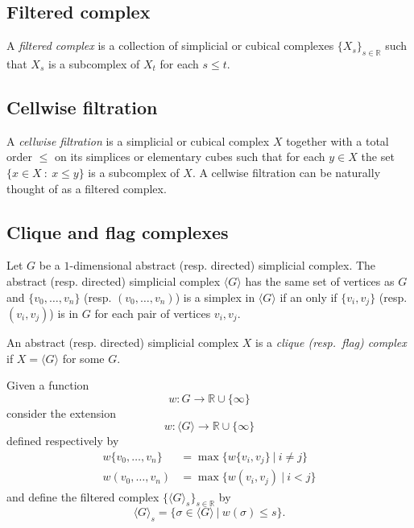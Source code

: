 \documentclass{amsart}
\begin{document}
	\subsection*{Filtered complex} \label{filtered_complex}
	
	A \textit{filtered complex} is a collection of simplicial or cubical complexes $\{X_s\}_{s \in \mathbb R}$ such that $X_s$ is a subcomplex of $X_t$ for each $s \leq t$.
	
	\subsection*{Cellwise filtration} \label{cellwise_filtration}
	
	A \textit{cellwise filtration} is a simplicial or cubical complex $X$ together with a total order $\leq$ on its simplices or elementary cubes such that for each $y \in X$ the set $\{x \in X\ :\ x \leq y\}$ is a subcomplex of $X$. A cellwise filtration can be naturally thought of as a 
	filtered complex.
	
	\subsection*{Clique and flag complexes} \label{clique_and_flag_complexes}
	
	Let $G$ be a $1$-dimensional abstract (resp. directed) simplicial complex. The abstract (resp. directed) simplicial complex $\langle G \rangle$ has the same set of vertices as $G$ and $\{v_0, \dots, v_n\}$ \big(resp. $(v_0, \dots, v_n)$\big) is a simplex in $\langle G \rangle$ if an only if $\{v_i, v_j\}$ \big(resp. $(v_i, v_j)$\big) is in $G$ for each pair of vertices $v_i, v_j$. 
	
	An abstract (resp. directed) simplicial complex $X$ is a \textit{clique (resp.\ flag) complex} if $X = \langle G \rangle$ for some $G$.
	
	Given a function
	\begin{equation*}
	w : G \to \mathbb R \cup \{\infty\}
	\end{equation*}
	consider the extension
	\begin{equation*}
	w : \langle G \rangle \to \mathbb R \cup \{\infty\}
	\end{equation*}
	defined respectively by 
	\begin{align*}
	w\{v_0, \dots, v_n\} & = \max\{ w\{v_i, v_j\}\ |\ i \neq j\} \\
	w(v_0, \dots, v_n) & = \max\{ w(v_i, v_j)\ |\ i < j\}
	\end{align*}
	and define the %
	filtered complex $\{\langle G \rangle_{s}\}_{s \in \mathbb R}$ by
	\begin{equation*}
	\langle G \rangle_s = \{\sigma \in \langle G \rangle\ |\ w(\sigma) \leq s\}.
	\end{equation*}
	
\end{document}
